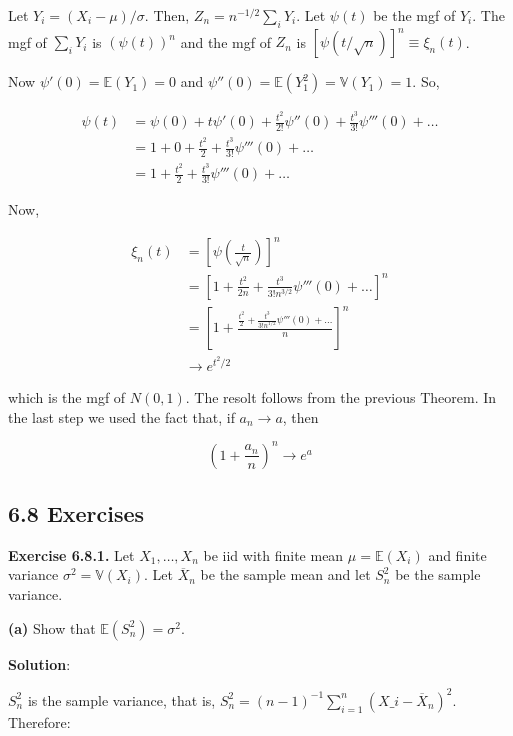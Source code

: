 Let \(Y_{i} = (X_{i} - \mu) / \sigma\). Then, \(Z_{n} = n^{-1/2} \sum_{i} Y_{i}\).
Let \(\psi(t)\) be the mgf of \(Y_{i}\). The mgf of \(\sum_{i} Y_{i}\) is
\((\psi(t))^{n}\) and the mgf of \(Z_{n}\) is
\([\psi(t / \sqrt{n})]^{n} \equiv \xi_{n}(t)\).

Now \(\psi'(0) = \mathbb{E}(Y_{1}) = 0\) and
\(\psi''(0) = \mathbb{E}(Y_{1}^{2}) = \mathbb{V}(Y_{1}) = 1\). So,

\begin{align*}
\psi(t) & = \psi(0) + t \psi'(0) + \frac{t^{2}}{2!} \psi''(0) + \frac{t^{3}}{3!} \psi'''(0) + \dots \\
        & = 1 + 0 + \frac{t^{2}}{2} +  \frac{t^{3}}{3!} \psi'''(0) + \ldots \\
        & = 1 + \frac{t^{2}}{2} +  \frac{t^{3}}{3!} \psi'''(0) + \ldots
\end{align*}

Now,

\begin{align*}
\xi_{n}(t) & = \left[ \psi \left( \frac{t}{\sqrt{n}} \right) \right] ^{n} \\
         & = \left[  1 + \frac{t^{2}}{2n} +  \frac{t^{3}}{3!n^{3/2}} \psi'''(0) + \ldots \right] ^{n} \\
         & = \left[  1 + \frac{\frac{t^{2}}{2} +  \frac{t^{3}}{3!n^{1/2}} \psi'''(0) + \ldots}{n} \right] ^{n} \\
         & \rightarrow e^{t^{2}/2}
\end{align*}

which is the mgf of \(N(0, 1)\). The resolt follows from the previous
Theorem. In the last step we used the fact that, if
\(a_{n} \rightarrow a\), then

\[ \left( 1 + \frac{a_{n}}{n} \right) ^{n} \rightarrow e^{a} \]

\subsection*{6.8 Exercises}

\textbf{Exercise 6.8.1.} Let \(X_{1}, \dots, X_{n}\) be iid with finite mean
\(\mu = \mathbb{E}(X_{i})\) and finite variance
\(\sigma^{2} = \mathbb{V}(X_{i})\). Let \(\overline{X}_{n}\) be the sample
mean and let \(S_{n}^{2}\) be the sample variance.

\textbf{(a)} Show that \(\mathbb{E}(S_{n}^{2}) = \sigma^{2}\).

\textbf{Solution}:

\(S_{n}^{2}\) is the sample variance, that is, $ S_{n}^{2} =
(n-1)^{-1} \sum_{i=1}^{n} ( X\_{i} - \overline{X}_{n})^{2} $.
Therefore:

